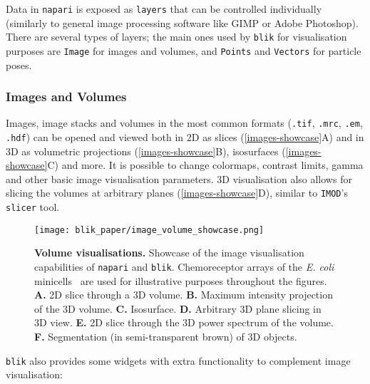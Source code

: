 Data in \texttt{napari} is exposed as \texttt{layers} that can be controlled individually (similarly to general image processing software like GIMP or Adobe Photoshop). There are several types of layers; the main ones used by \texttt{blik} for visualisation purposes are \texttt{Image} for images and volumes, and \texttt{Points} and \texttt{Vectors} for particle poses.

\subsubsection{Images and Volumes}\label{images-and-volumes}

Images, image stacks and volumes in the most common formats (\texttt{.tif}, \texttt{.mrc}, \texttt{.em}, \texttt{.hdf}) can be opened and viewed both in 2D as slices (\autoref{images-showcase}A) and in 3D as volumetric projections (\autoref{images-showcase}B), isosurfaces (\autoref{images-showcase}C) and more. It is possible to change colormaps, contrast limits, gamma and other basic image visualisation parameters. 3D visualisation also allows for slicing the volumes at arbitrary planes (\autoref{images-showcase}D), similar to \texttt{IMOD}'s \texttt{slicer} tool.

\begin{figure}[!ht]
    \centering
    \texttt{[image: blik\_paper/image\_volume\_showcase.png]}
    \caption[Volume visualisations]{\textbf{Volume visualisations.} Showcase of the image visualisation capabilities of \texttt{napari} and \texttt{blik}. Chemoreceptor arrays of the \textit{E. coli} minicells~\cite{burtCompleteStructureChemosensory2020} are used for illustrative purposes throughout the figures. \textbf{A.} 2D slice through a 3D volume. \textbf{B.} Maximum intensity projection of the 3D volume. \textbf{C.} Isosurface. \textbf{D.} Arbitrary 3D plane slicing in 3D view. \textbf{E.} 2D slice through the 3D power spectrum of the volume. \textbf{F.} Segmentation (in semi-transparent brown) of 3D objects.}
    \label{images-showcase}
\end{figure}

\texttt{blik} also provides some widgets with extra functionality to complement image visualisation:


